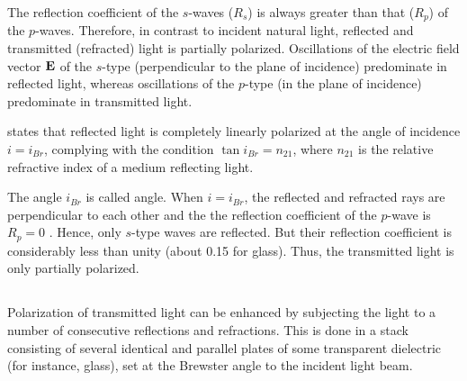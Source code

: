 The reflection coefficient  of the $s$-waves ($R_{s}$) is always greater than that ($R_{p}$) of the $p$-waves. Therefore, in contrast to incident natural light, reflected and transmitted (refracted) light is partially polarized. Oscillations of the electric field vector
$\vb{E} $ of the $s$-type (perpendicular to the plane of incidence) predominate in reflected light, whereas oscillations of the $p$-type (in the plane of incidence) predominate in transmitted light.

 states that reflected light is completely linearly polarized at the angle of incidence $i = i_{Br}$, complying with the condition $\tan i_{Br} =  n_{21}$, where $n_{21}$ is the relative refractive index of a medium reflecting light.

The angle $i_{Br}$ is called  angle. When $i = i_{Br}$, the reflected and refracted rays are perpendicular to each other and the the reflection coefficient of the $p$-wave is $R_{p} = 0$ . Hence, only $s$-type waves are reflected. But their reflection coefficient is considerably less than unity (about 0.15 for glass). Thus, the transmitted light is only partially polarized.

\subsection{}\label{35.1.4} Polarization of transmitted light can be enhanced by subjecting the light to a number of consecutive reflections and refractions. This is done in a stack consisting of several identical and parallel plates of some transparent dielectric (for instance, glass), set at the Brewster angle to the incident light beam.

